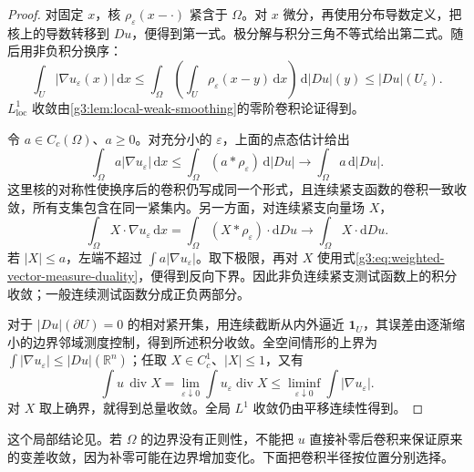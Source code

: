 \begin{proof}
	对固定 \(x\)，核 \(\rho_\varepsilon(x-\cdot)\) 紧含于 \(\Omega\)。对 \(x\) 微分，再使用分布导数定义，把核上的导数转移到 \(Du\)，便得到第一式。极分解与积分三角不等式给出第二式。随后用非负积分换序：
	\[
		\int_U|\nabla u_\varepsilon(x)|\,\mathrm dx
		\le\int_\Omega\left(\int_U\rho_\varepsilon(x-y)\,\mathrm dx\right)
		\,\mathrm d|Du|(y)
		\le|Du|(U_\varepsilon).
	\]
	\(L^1_{\mathrm{loc}}\) 收敛由\cref{g3:lem:local-weak-smoothing}的零阶卷积论证得到。

	令 \(a\in C_c(\Omega)\)、\(a\ge0\)。对充分小的 \(\varepsilon\)，上面的点态估计给出
	\[
		\int_\Omega a|\nabla u_\varepsilon|\,\mathrm dx
		\le\int_\Omega(a*\rho_\varepsilon)\,\mathrm d|Du|
		\longrightarrow\int_\Omega a\,\mathrm d|Du|.
	\]
	这里核的对称性使换序后的卷积仍写成同一个形式，且连续紧支函数的卷积一致收敛，所有支集包含在同一紧集内。另一方面，对连续紧支向量场 \(X\)，
	\[
		\int_\Omega X\cdot\nabla u_\varepsilon\,\mathrm dx
		=\int_\Omega(X*\rho_\varepsilon)\cdot\mathrm dDu
		\longrightarrow\int_\Omega X\cdot\mathrm dDu.
	\]
	若 \(|X|\le a\)，左端不超过 \(\int a|\nabla u_\varepsilon|\)。取下极限，再对 \(X\) 使用式\eqref{g3:eq:weighted-vector-measure-duality}，便得到反向下界。因此非负连续紧支测试函数上的积分收敛；一般连续测试函数分成正负两部分。

	对于 \(|Du|(\partial U)=0\) 的相对紧开集，用连续截断从内外逼近 \(\mathbf1_U\)，其误差由逐渐缩小的边界邻域测度控制，得到所述积分收敛。全空间情形的上界为 \(\int|\nabla u_\varepsilon|\le|Du|(\mathbb R^n)\)；任取 \(X\in C_c^1\)、\(|X|\le1\)，又有
	\[
		\int u\,\operatorname{div}X
		=\lim_{\varepsilon\downarrow0}\int u_\varepsilon\operatorname{div}X
		\le\liminf_{\varepsilon\downarrow0}\int|\nabla u_\varepsilon|.
	\]
	对 \(X\) 取上确界，就得到总量收敛。全局 \(L^1\) 收敛仍由平移连续性得到。
\end{proof}

这个局部结论见\cite[第6节，引理6.2，第36--37页]{Simon1983}。若 \(\Omega\) 的边界没有正则性，不能把 \(u\) 直接补零后卷积来保证原来的变差收敛，因为补零可能在边界增加变化。下面把卷积半径按位置分别选择。


